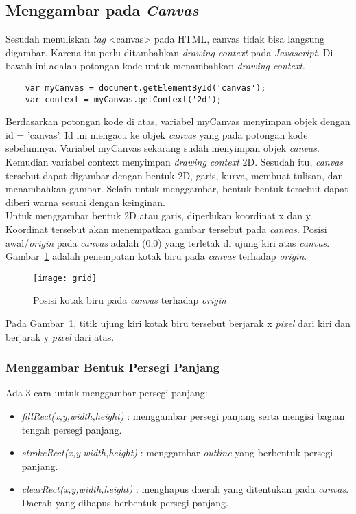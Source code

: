 \subsection{Menggambar pada \textit{Canvas}}
Sesudah menuliskan \textit{tag} <canvas> pada HTML, canvas tidak bisa langsung digambar. Karena itu perlu ditambahkan \textit{drawing context} pada \textit{Javascript}. Di bawah ini adalah potongan kode untuk menambahkan \textit{drawing context}.

\begin{lstlisting}
	var myCanvas = document.getElementById('canvas');
	var context = myCanvas.getContext('2d');
\end{lstlisting}

Berdasarkan potongan kode di atas, variabel myCanvas menyimpan objek dengan id = 'canvas'. Id ini mengacu ke objek \textit{canvas} yang pada potongan kode sebelumnya. Variabel myCanvas sekarang sudah menyimpan objek \textit{canvas}. Kemudian variabel context menyimpan \textit{drawing context} 2D. Sesudah itu, \textit{canvas} tersebut dapat digambar dengan bentuk 2D, garis, kurva, membuat tulisan, dan menambahkan gambar. Selain untuk menggambar, bentuk-bentuk tersebut dapat diberi warna sesuai dengan keinginan.\\

Untuk menggambar bentuk 2D atau garis, diperlukan koordinat x dan y. Koordinat tersebut akan menempatkan gambar tersebut pada \textit{canvas}. Posisi awal/\textit{origin} pada \textit{canvas} adalah (0,0) yang terletak di ujung kiri atas \textit{canvas}. Gambar~\ref{fig:grid} adalah penempatan kotak biru pada \textit{canvas} terhadap \textit{origin}.

\begin{figure}[H]
	\centering  
	\texttt{[image: grid]}
	\caption[Posisi kotak biru pada \textit{canvas} terhadap \textit{origin}]{Posisi kotak biru pada \textit{canvas} terhadap \textit{origin}}
	\label{fig:grid} 
\end{figure} 

Pada Gambar~\ref{fig:grid}, titik ujung kiri kotak biru tersebut berjarak x \textit{pixel} dari kiri dan berjarak y \textit{pixel} dari atas. 

\subsubsection{Menggambar Bentuk Persegi Panjang}
Ada 3 cara untuk menggambar persegi panjang:

\begin{itemize}
	\item \textit{fillRect(x,y,width,height)} : menggambar persegi panjang serta mengisi bagian tengah persegi panjang.
	\item \textit{strokeRect(x,y,width,height)} : menggambar \textit{outline} yang berbentuk persegi panjang.
	\item \textit{clearRect(x,y,width,height)} : menghapus daerah yang ditentukan pada \textit{canvas}. Daerah yang dihapus berbentuk persegi panjang.
\end{itemize}

